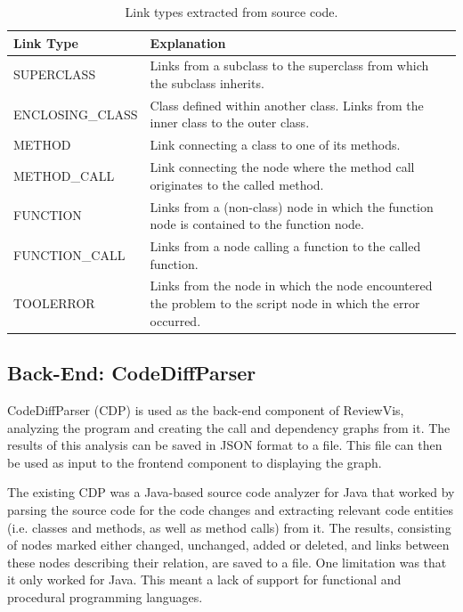 \documentclass[a4paper,11pt,twoside]{article}
\theoremstyle{definition} %
\begin{document}
\begin{table}[h!]
\begin{center}
\begin{tabular}{m{4.5cm} | m{9cm}} 
 \hline
 \rowcolor{lightgray} Link Type & Explanation \\
 \hline
 SUPERCLASS & Links from a subclass to the superclass from which the subclass inherits. \\
 \hline
 ENCLOSING\_CLASS & Class defined within another class. Links from the inner class to the outer class. \\ 
 \hline
 METHOD & Link connecting a class to one of its methods. \\
 \hline
 METHOD\_CALL & Link connecting the node where the method call originates to the called method. \\
 \hline
 FUNCTION & Links from a (non-class) node in which the function node is contained to the function node. \\
 \hline
 FUNCTION\_CALL & Links from a node calling a function to the called function. \\
 \hline
 TOOLERROR & Links from the node in which the node encountered the problem to the script node in which the error occurred. \\
 \hline
\end{tabular}
\end{center}
\caption{Link types extracted from source code.}
\label{table:PyLinkTypes}
\end{table}


\subsection{Back-End: CodeDiffParser} \label{SubSec:Backend}

CodeDiffParser (CDP) is used as the back-end component of ReviewVis, analyzing the program and creating the call and dependency graphs from it. The results of this analysis can be saved in JSON format to a file. This file can then be used as input to the frontend component to displaying the graph.

The existing CDP was a Java-based source code analyzer for Java that worked by parsing the source code for the code changes and extracting relevant code entities (i.e. classes and methods, as well as method calls) from it. The results, consisting of nodes marked either changed, unchanged, added or deleted, and links between these nodes describing their relation, are saved to a file. One limitation was that it only worked for Java. This meant a lack of support for functional and procedural programming languages. 
\end{document}
